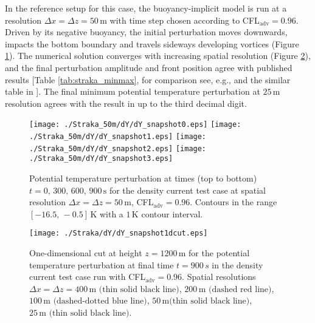 \documentclass{ametsoc}
\theoremstyle{definition}
\begin{document}
In the reference setup for this case, the buoyancy-implicit model is run at a resolution $\Delta x=\Delta z=50\,\textrm{m}$ with time step chosen according to CFL$_\textrm{adv}=0.96$. Driven by its negative buoyancy, the initial perturbation moves downwards, impacts the bottom boundary and travels sideways developing vortices (Figure \ref{fig:straka}). The numerical solution converges with increasing spatial resolution (Figure \ref{fig:straka1dcut}), and the final perturbation amplitude and front position agree with published results [Table \ref{tab:straka_minmax}, for comparison see, e.g., \cite{GiraldoRestelli2008} and the similar table in \cite{MelvinEtAl2018}]. The final minimum potential temperature perturbation at $25\,\textrm{m}$ resolution agrees with the result in \cite{MelvinEtAl2018} up to the third decimal digit.

\begin{figure}
\centering
 \texttt{[image: ./Straka\_50m/dY/dY\_snapshot0.eps]}
 \texttt{[image: ./Straka\_50m/dY/dY\_snapshot1.eps]}
 \texttt{[image: ./Straka\_50m/dY/dY\_snapshot2.eps]}
 \texttt{[image: ./Straka\_50m/dY/dY\_snapshot3.eps]}
 \caption{Potential temperature perturbation at times (top to bottom) $t=0,\,300,\,600,\,900\,\textrm{s}$ for the density current test case at spatial resolution $\Delta x=\Delta z=50\,\textrm{m}$, CFL$_\textrm{adv}=0.96$. Contours in the range $[-16.5,\,-0.5]\,\textrm{K}$ with a $1\,\textrm{K}$ contour interval.}
 \label{fig:straka}
\end{figure}

\begin{figure}
\centering
  \texttt{[image: ./Straka/dY/dY\_snapshot1dcut.eps]}
 \caption{One-dimensional cut at height $z=1200\,\textrm{m}$ for the potential temperature perturbation at final time $t=900\, s$ in the density current test case run with CFL$_\textrm{adv}=0.96$. Spatial resolutions $\Delta x=\Delta z=400\,\textrm{m (thin solid black line)}$, $200\,\textrm{m (dashed red line)}$, $100\,\textrm{m (dashed-dotted blue line)}$, $50\,\textrm{m(thin solid black line)}$, $25\,\textrm{m (thin solid black line)}$.}
 \label{fig:straka1dcut}
\end{figure}
\end{document}
